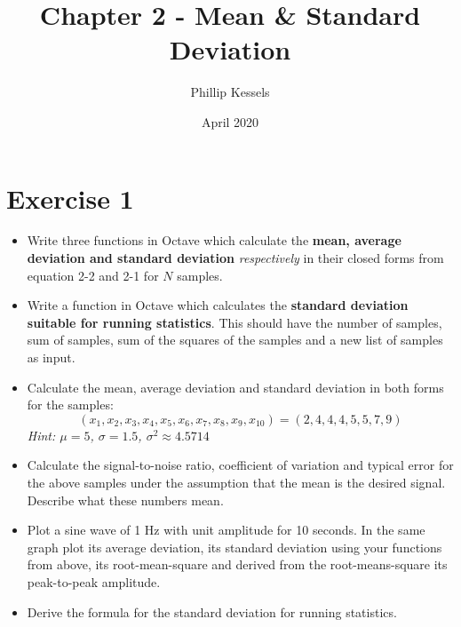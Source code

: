 \documentclass{article}
\title{Chapter 2 - Mean \& Standard Deviation}
\author{Phillip Kessels}
\date{April 2020}
\begin{document}
\maketitle

\section*{Exercise 1}
\begin{itemize}
    \item Write three functions in Octave which calculate the \textbf{mean, average deviation and standard deviation} \textit{respectively} in their closed forms from equation 2-2 and 2-1 for $N$ samples.
    \item Write a function in Octave which calculates the \textbf{standard deviation suitable for running statistics}. This should have the number of samples, sum of samples, sum of the squares of the samples and a new list of samples as input.
    \item Calculate the mean, average deviation and standard deviation in both forms for the samples: $$(x_1,x_2,x_3,x_4,x_5,x_6,x_7,x_8,x_9,x_{10})=(2,4,4,4,5,5,7,9)$$ \textit{Hint: $\mu = 5$, $\sigma = 1.5$, $\sigma^2\approx4.5714$}
    \item Calculate the signal-to-noise ratio, coefficient of variation and typical error for the above samples under the assumption that the mean is the desired signal. Describe what these numbers mean.
    \item Plot a sine wave of 1 Hz with unit amplitude for 10 seconds. In the same graph plot its average deviation, its standard deviation using your functions from above, its root-mean-square and derived from the root-means-square its peak-to-peak amplitude.
    \item Derive the formula for the standard deviation for running statistics.
\end{itemize}
\end{document}
